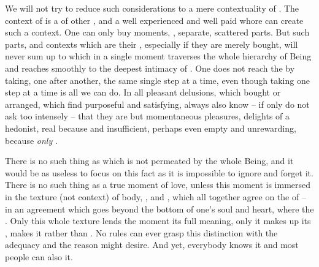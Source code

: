 \pa %
We will not try to reduce such considerations to a mere contextuality of
.  The context of  is a  of
other , and a well experienced and well paid whore can create
such a context.  One can only buy moments, , separate, scattered
parts.  But such parts, and contexts which are their , especially
if they are merely bought, will never sum up to  which in a
single moment traverses the whole hierarchy of Being and reaches smoothly to the
deepest intimacy of .  One does not reach the
 by taking, one after another, the same single step at a time, even
though taking one step at a time is all we can do.
In all pleasant delusions, which  bought or arranged, which  find
purposeful and satisfying,  always also know -- if only  do not ask
too intensely -- that they are but momentaneous pleasures, delights of a
hedonist, real because  and insufficient, perhaps even empty and
unrewarding, because {\em only} .

\pa There is no such thing as  which is not permeated by
the whole Being, and it would be as useless to focus on this fact as it is
impossible to ignore and forget it.  There is no such thing as a true moment of
love, unless this moment is immersed in the texture (not context) of body,
,  and , which all together agree on the
 of  -- in an agreement which goes beyond the bottom of
one's soul and heart, where the .  Only this whole
texture lends the  moment its full meaning, only it makes up its
, makes it  rather than
. No  rules can ever grasp this distinction with the
adequacy and  the  reason might desire. And yet,
everybody knows it and most people can also  it.


